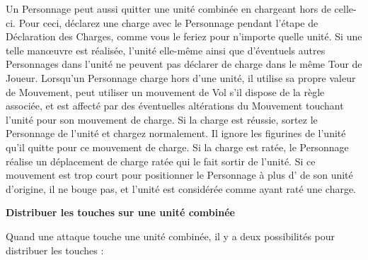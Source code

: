 Un Personnage peut aussi quitter une unité combinée en chargeant hors de celle-ci. Pour ceci, déclarez une charge avec le Personnage pendant l'étape de Déclaration des Charges, comme vous le feriez pour n'importe quelle unité. Si une telle manœuvre est réalisée, l'unité elle-même ainsi que d'éventuels autres Personnages dans l'unité ne peuvent pas déclarer de charge dans le même Tour de Joueur.  Lorsqu'un Personnage charge hors d'une unité, il utilise sa propre valeur de Mouvement, peut utiliser un mouvement de Vol s'il dispose de la règle associée, et est affecté par des éventuelles altérations du Mouvement touchant l'unité pour son mouvement de charge. Si la charge est réussie, sortez le Personnage de l'unité et chargez normalement. Il ignore les figurines de l'unité qu'il quitte pour ce mouvement de charge. Si la charge est ratée, le Personnage réalise un déplacement de charge ratée qui le fait sortir de l'unité. Si ce mouvement est trop court pour positionner le Personnage à plus d' de son unité d'origine, il ne bouge pas, et l'unité est considérée comme ayant raté une charge.

\noindent\textbf{Distribuer les touches sur une unité combinée}

Quand une attaque touche une unité combinée, il y a deux possibilités pour distribuer les touches :

